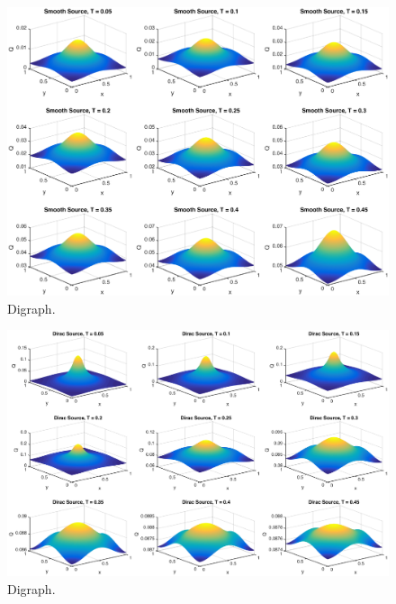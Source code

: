\begin{figure}[!htb]
\centering
\includegraphics[scale=.5]{smoothSource4_1.eps}
\caption{Digraph.}
\label{fig:digraph}
\end{figure}

\begin{figure}[!htb]
\centering
\includegraphics[scale=.5]{diracSource4_1.eps}
\caption{Digraph.}
\label{fig:digraph}
\end{figure}